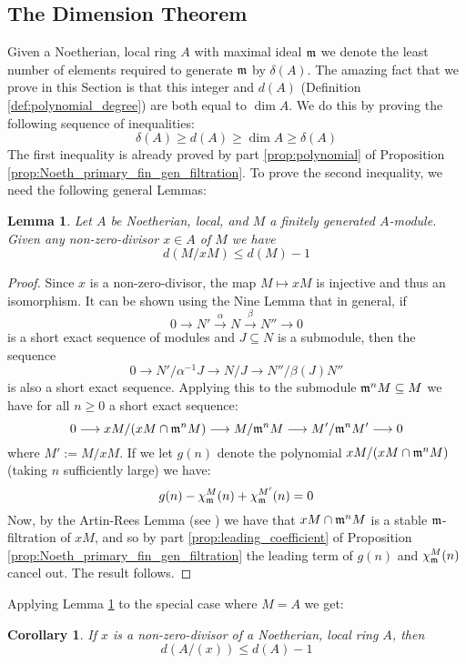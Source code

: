 \documentclass[12pt]{article}
\theoremstyle{plain}
\newtheorem{lemma}[thm]{Lemma}
\newtheorem{cor}[thm]{Corollary}
\theoremstyle{definition}
\newcommand{\lto}{\longrightarrow}
\begin{document}
	\subsection{The Dimension Theorem}
	Given a Noetherian, local ring $A$ with maximal ideal $\frak{m}$ we denote the least number of elements required to generate $\frak{m}$ by $\delta(A)$. The amazing fact that we prove in this Section is that this integer and $d(A)$ (Definition \ref{def:polynomial_degree}) are both equal to $\operatorname{dim}A$. We do this by proving the following sequence of inequalities:
	\[\delta(A) \geq d(A) \geq \operatorname{dim}A \geq \delta(A)\]
	The first inequality is already proved by part \ref{prop:polynomial} of Proposition \ref{prop:Noeth_primary_fin_gen_filtration}. To prove the second inequality, we need the following general Lemmas:
	\begin{lemma}
		\label{lem:degree_modulo}
		Let $A$ be Noetherian, local, and $M$ a finitely generated $A$-module. Given any non-zero-divisor $x \in A$ of $M$ we have
		\begin{equation}
			\label{eq:dimension_inductive_reduction} d(M/xM) \leq d(M) - 1
		\end{equation}
	\end{lemma}
	\begin{proof}
		Since $x$ is a non-zero-divisor, the map $M \longmapsto xM$ is injective and thus an isomorphism. It can be shown using the Nine Lemma that in general, if
		\[0 \lto N' \stackrel{\alpha}{\lto} N \stackrel{\beta}{\lto} N'' \lto 0\]
		is a short exact sequence of modules and $J \subseteq N$ is a submodule, then the sequence
		\[0 \lto N'/\alpha^{-1}J \lto N/J \lto N''/\beta(J)N''\]
		is also a short exact sequence. Applying this to the submodule $\frak{m}^nM \subseteq M$ we have for all $n \geq 0$ a short exact sequence:
		\[0 \lto xM/(xM \cap \frak{m}^nM) \lto M/\frak{m}^nM \lto M'/\frak{m}^nM' \lto 0\]
		where $M' := M/xM$. If we let $g(n)$ denote the polynomial $xM/(xM \cap \frak{m}^nM)$ (taking $n$ sufficiently large) we have:
		\[g(n) - \chi_\frak{m}^M(n) + \chi_\frak{m}^{M'}(n) = 0\]
		Now, by the Artin-Rees Lemma (see \cite{completion}) we have that $xM \cap \frak{m}^nM$ is a stable $\frak{m}$-filtration of $xM$, and so by part \ref{prop:leading_coefficient} of Proposition \ref{prop:Noeth_primary_fin_gen_filtration} the leading term of $g(n)$ and $\chi_\frak{m}^M(n)$ cancel out. The result follows.
	\end{proof}
	Applying Lemma \ref{lem:degree_modulo} to the special case where $M = A$ we get:
	\begin{cor}
		\label{cor:degree_ring_inductive_reduction}
		If $x$ is a non-zero-divisor of a Noetherian, local ring $A$, then
		\[d(A/(x)) \leq d(A) - 1\]
	\end{cor}
\end{document}
